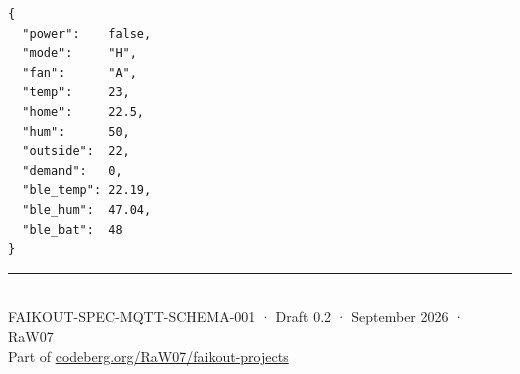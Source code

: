 \documentclass[11pt,a4paper]{article}
\begin{document}
\begin{lstlisting}[style=json]
{
  "power":    false,
  "mode":     "H",
  "fan":      "A",
  "temp":     23,
  "home":     22.5,
  "hum":      50,
  "outside":  22,
  "demand":   0,
  "ble_temp": 22.19,
  "ble_hum":  47.04,
  "ble_bat":  48
}
\end{lstlisting}

\vfill
\begin{center}
\color{codegray}\small
\rule{0.5\textwidth}{0.3pt}\\[4pt]
FAIKOUT-SPEC-MQTT-SCHEMA-001 · Draft 0.2 · September 2026 · RaW07\\
Part of \href{https://codeberg.org/RaW07/faikout-projects}{codeberg.org/RaW07/faikout-projects}
\end{center}
\end{document}
